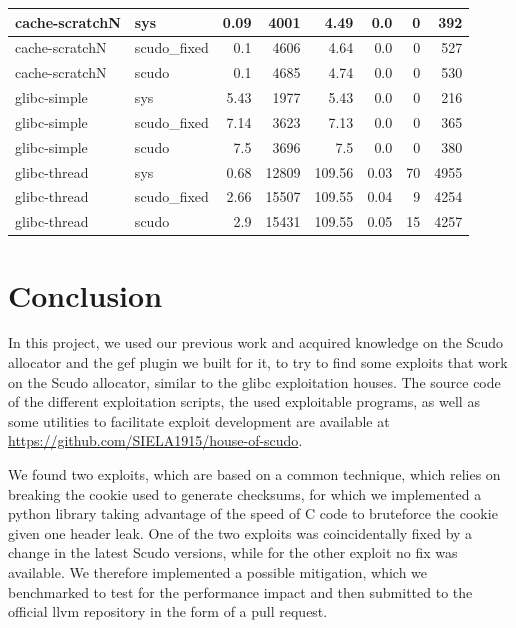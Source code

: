 \documentclass[a4paper,11pt,oneside]{report}
\begin{document}
\begin{longtable}[h]{l l r r r r r r}
  \midrule
  cache-scratchN & sys & 0.09 & 4001 & 4.49 & 0.0 & 0 & 392 \\
  \midrule
  cache-scratchN & scudo\_fixed & 0.1 & 4606 & 4.64 & 0.0 & 0 & 527 \\
  \midrule
  cache-scratchN & scudo & 0.1 & 4685 & 4.74 & 0.0 & 0 & 530 \\
  \midrule
  glibc-simple & sys & 5.43 & 1977 & 5.43 & 0.0 & 0 & 216 \\
  \midrule
  glibc-simple & scudo\_fixed & 7.14 & 3623 & 7.13 & 0.0 & 0 & 365 \\
  \midrule
  glibc-simple & scudo & 7.5 & 3696 & 7.5 & 0.0 & 0 & 380 \\
  \midrule
  glibc-thread & sys & 0.68 & 12809 & 109.56 & 0.03 & 70 & 4955 \\
  \midrule
  glibc-thread & scudo\_fixed & 2.66 & 15507 & 109.55 & 0.04 & 9 & 4254 \\
  \midrule
  glibc-thread & scudo & 2.9 & 15431 & 109.55 & 0.05 & 15 & 4257 \\
  \bottomrule
\end{longtable}


\chapter{Conclusion}

In this project, we used our previous work and acquired knowledge on the Scudo allocator
and the gef plugin we built for it, to try to find some exploits that work on the Scudo
allocator, similar to the glibc exploitation houses. The source code of the different
exploitation scripts, the used exploitable programs, as well as some utilities to
facilitate exploit development are available at
\url{https://github.com/SIELA1915/house-of-scudo}.

We found two exploits, which are based on a common technique, which relies on breaking the
cookie used to generate checksums, for which we implemented a python library taking
advantage of the speed of C code to bruteforce the cookie given one header leak. One of
the two exploits was coincidentally fixed by a change in the latest Scudo versions, while
for the other exploit no fix was available. We therefore implemented a possible
mitigation, which we benchmarked to test for the performance impact and then submitted to
the official llvm repository in the form of a pull request.


\cleardoublepage{}
\printbibliography{}
\end{document}
